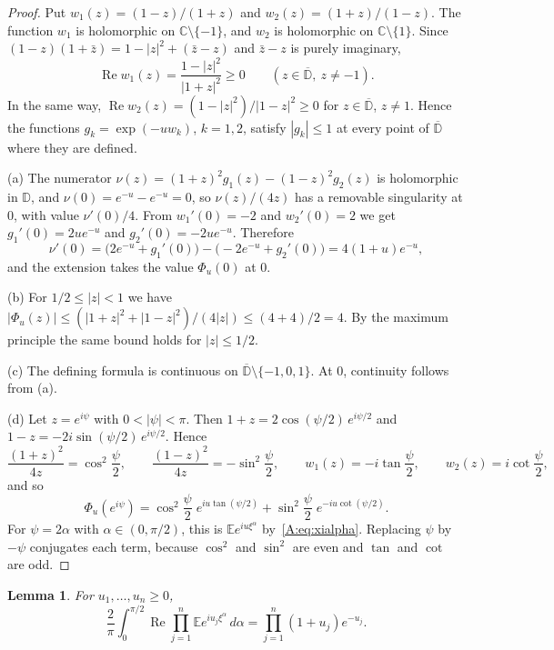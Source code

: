 \documentclass[11pt]{amsart}
\newtheorem{lemma}[theorem]{Lemma}
\theoremstyle{remark}
\numberwithin{equation}{section}
\newcommand{\E}{\mathbb{E}}
\begin{document}
\begin{proof}
Put $w_1(z)=(1-z)/(1+z)$ and $w_2(z)=(1+z)/(1-z)$. The function $w_1$ is holomorphic on $\mathbb C\setminus\{-1\}$, and $w_2$ is holomorphic on $\mathbb C\setminus\{1\}$. Since $(1-z)(1+\bar z)=1-|z|^2+(\bar z-z)$ and $\bar z-z$ is purely imaginary,
\[
\operatorname{Re}w_1(z)=\frac{1-|z|^2}{|1+z|^2}\ge0\qquad(z\in\overline{\mathbb D},\ z\ne-1).
\]
In the same way, $\operatorname{Re}w_2(z)=(1-|z|^2)/|1-z|^2\ge0$ for $z\in\overline{\mathbb D}$, $z\ne1$. Hence the functions $g_k=\exp(-uw_k)$, $k=1,2$, satisfy $|g_k|\le1$ at every point of $\overline{\mathbb D}$ where they are defined.

(a) The numerator $\nu(z)=(1+z)^2g_1(z)-(1-z)^2g_2(z)$ is holomorphic in $\mathbb D$, and $\nu(0)=e^{-u}-e^{-u}=0$, so $\nu(z)/(4z)$ has a removable singularity at $0$, with value $\nu'(0)/4$. From $w_1'(0)=-2$ and $w_2'(0)=2$ we get $g_1'(0)=2ue^{-u}$ and $g_2'(0)=-2ue^{-u}$. Therefore
\[
\nu'(0)=\bigl(2e^{-u}+g_1'(0)\bigr)-\bigl(-2e^{-u}+g_2'(0)\bigr)=4(1+u)e^{-u},
\]
and the extension takes the value $\Phi_u(0)$ at $0$.

(b) For $1/2\le|z|<1$ we have $|\Phi_u(z)|\le(|1+z|^2+|1-z|^2)/(4|z|)\le(4+4)/2=4$. By the maximum principle the same bound holds for $|z|\le1/2$.

(c) The defining formula is continuous on $\overline{\mathbb D}\setminus\{-1,0,1\}$. At $0$, continuity follows from (a).

(d) Let $z=e^{i\psi}$ with $0<|\psi|<\pi$. Then $1+z=2\cos(\psi/2)\,e^{i\psi/2}$ and $1-z=-2i\sin(\psi/2)\,e^{i\psi/2}$. Hence
\[
\frac{(1+z)^2}{4z}=\cos^2\frac\psi2,\qquad \frac{(1-z)^2}{4z}=-\sin^2\frac\psi2,\qquad w_1(z)=-i\tan\frac\psi2,\qquad w_2(z)=i\cot\frac\psi2,
\]
and so
\[
\Phi_u(e^{i\psi})=\cos^2\frac\psi2\;e^{iu\tan(\psi/2)}+\sin^2\frac\psi2\;e^{-iu\cot(\psi/2)}.
\]
For $\psi=2\alpha$ with $\alpha\in(0,\pi/2)$, this is $\E e^{iu\xi^\alpha}$ by~\eqref{A:eq:xialpha}. Replacing $\psi$ by $-\psi$ conjugates each term, because $\cos^2$ and $\sin^2$ are even and $\tan$ and $\cot$ are odd.
\end{proof}

\begin{lemma}\label{A:lem:mv}
For $u_1,\dots,u_n\ge0$,
\[
\frac2\pi\int_0^{\pi/2}\operatorname{Re}\prod_{j=1}^n\E e^{iu_j\xi^\alpha}\,d\alpha=\prod_{j=1}^n(1+u_j)e^{-u_j}.
\]
\end{lemma}
\end{document}
